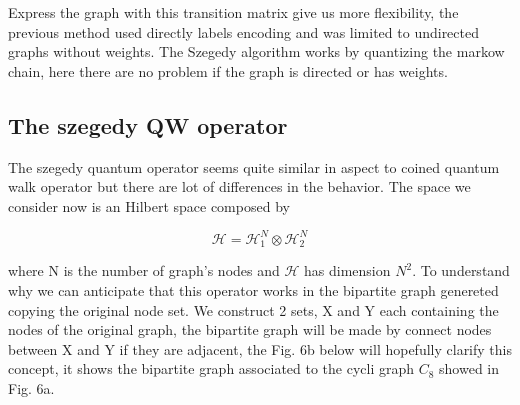 Express the graph with this transition matrix give us more flexibility, the previous 
method used directly labels encoding and was limited to undirected graphs without weights. The Szegedy algorithm works by quantizing the markow chain, here there are no problem if the graph is directed
or has weights. 

\subsection{The szegedy QW operator}
The szegedy quantum operator seems quite similar in aspect to coined quantum walk operator but there are lot of differences in the behavior. 
The space we consider now is an Hilbert space composed by 

\begin{equation}
    \mathcal{H} = \mathcal{H}_{1}^{N} \otimes \mathcal{H}_{2}^{N}
\end{equation}

where N is the number of graph's nodes and $\mathcal{H}$ has dimension $N^2$. To understand why we can anticipate that this operator works in the bipartite graph genereted copying the original node set. 
We construct 2 sets, X and Y each containing the nodes of the original graph, the bipartite graph will be 
made by connect nodes between X and Y if they are adjacent, the Fig. 6b below will hopefully clarify this concept, it shows the bipartite graph associated
to the cycli graph $C_{8}$ showed in Fig. 6a.


